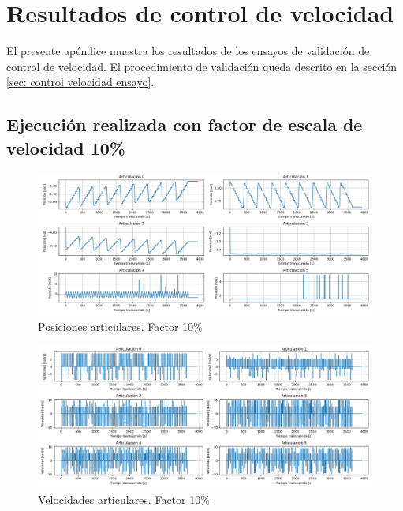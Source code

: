 \chapter{Resultados de control de velocidad}
\label{cap: anexo control velocidad}

El presente apéndice muestra los resultados de los ensayos de validación de control de velocidad. El procedimiento de validación queda descrito en la sección \ref{sec: control velocidad ensayo}.

\section{Ejecución realizada con factor de escala de velocidad 10\%}

\begin{figure}[H]
    \centering
    \includegraphics[scale=0.30]{figuras/ensayo_control_velocidad/posiciones articulares 0.1.png}
    \caption{Posiciones articulares. Factor 10\%}
    \label{fig:posiciones articulares 0.1}
\end{figure}

\begin{figure}[H]
    \centering
    \includegraphics[scale=0.30]{figuras/ensayo_control_velocidad/velocidades articulares 0.1.png}
    \caption{Velocidades articulares. Factor 10\%}
    \label{fig:velocidades articulares 0.1}
\end{figure}

